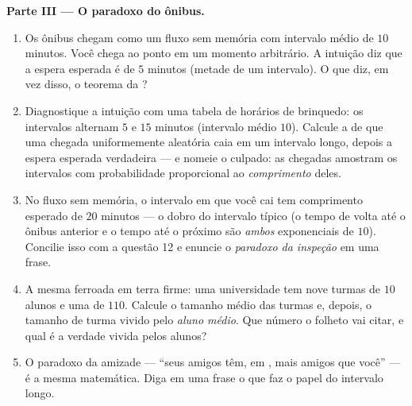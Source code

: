 \begin{problem}
\medskip
\noindent\textbf{Parte III --- O paradoxo do ônibus.}
\begin{enumerate}[resume]
  \item Os ônibus chegam como um fluxo sem memória com
        intervalo médio de $10$ minutos. Você chega ao ponto em
        um momento arbitrário. A intuição diz que a espera
        esperada é de $5$ minutos (metade de um intervalo). O
        que diz, em vez disso, o teorema da ?
  \item Diagnostique a intuição com uma tabela de horários de
        brinquedo: os intervalos alternam $5$ e $15$ minutos
        (intervalo médio $10$). Calcule a  de que
        uma chegada uniformemente aleatória caia em um
        intervalo longo, depois a espera esperada verdadeira
        --- e nomeie o culpado: as chegadas amostram os
        intervalos com probabilidade proporcional ao
        \emph{comprimento} deles.
  \item No fluxo sem memória, o intervalo em que você cai tem
        comprimento esperado de $20$ minutos --- o dobro do
        intervalo típico (o tempo de volta até o ônibus
        anterior e o tempo até o próximo são \emph{ambos}
        exponenciais de  $10$). Concilie isso com a
        questão 12 e enuncie o \emph{paradoxo da inspeção} em
        uma frase.
  \item A mesma ferroada em terra firme: uma universidade tem
        nove turmas de $10$ alunos e uma de $110$. Calcule o
        tamanho médio das turmas e, depois, o tamanho de turma
        vivido pelo \emph{aluno médio}. Que número o folheto
        vai citar, e qual é a verdade vivida pelos alunos?
  \item O paradoxo da amizade --- ``seus amigos têm, em ,
        mais amigos que você'' --- é a mesma matemática. Diga
        em uma frase o que faz o papel do intervalo longo.
\end{enumerate}


\end{problem}
